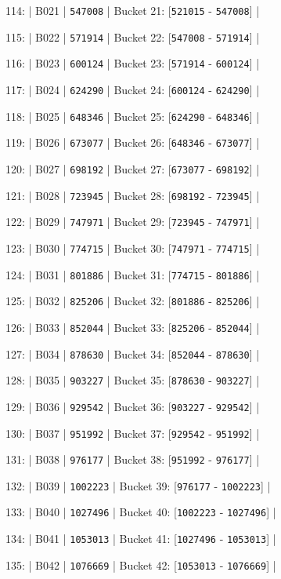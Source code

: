 \documentclass[11pt,a4paper]{article}
\begin{document}
{{{114: | B021 | \texttt{547008} | Bucket 21: [\texttt{521015} - \texttt{547008}] |

115: | B022 | \texttt{571914} | Bucket 22: [\texttt{547008} - \texttt{571914}] |

116: | B023 | \texttt{600124} | Bucket 23: [\texttt{571914} - \texttt{600124}] |

117: | B024 | \texttt{624290} | Bucket 24: [\texttt{600124} - \texttt{624290}] |

118: | B025 | \texttt{648346} | Bucket 25: [\texttt{624290} - \texttt{648346}] |

119: | B026 | \texttt{673077} | Bucket 26: [\texttt{648346} - \texttt{673077}] |

120: | B027 | \texttt{698192} | Bucket 27: [\texttt{673077} - \texttt{698192}] |

121: | B028 | \texttt{723945} | Bucket 28: [\texttt{698192} - \texttt{723945}] |

122: | B029 | \texttt{747971} | Bucket 29: [\texttt{723945} - \texttt{747971}] |

123: | B030 | \texttt{774715} | Bucket 30: [\texttt{747971} - \texttt{774715}] |

124: | B031 | \texttt{801886} | Bucket 31: [\texttt{774715} - \texttt{801886}] |

125: | B032 | \texttt{825206} | Bucket 32: [\texttt{801886} - \texttt{825206}] |

126: | B033 | \texttt{852044} | Bucket 33: [\texttt{825206} - \texttt{852044}] |

127: | B034 | \texttt{878630} | Bucket 34: [\texttt{852044} - \texttt{878630}] |

128: | B035 | \texttt{903227} | Bucket 35: [\texttt{878630} - \texttt{903227}] |

129: | B036 | \texttt{929542} | Bucket 36: [\texttt{903227} - \texttt{929542}] |

130: | B037 | \texttt{951992} | Bucket 37: [\texttt{929542} - \texttt{951992}] |

131: | B038 | \texttt{976177} | Bucket 38: [\texttt{951992} - \texttt{976177}] |

132: | B039 | \texttt{1002223} | Bucket 39: [\texttt{976177} - \texttt{1002223}] |

133: | B040 | \texttt{1027496} | Bucket 40: [\texttt{1002223} - \texttt{1027496}] |

134: | B041 | \texttt{1053013} | Bucket 41: [\texttt{1027496} - \texttt{1053013}] |

135: | B042 | \texttt{1076669} | Bucket 42: [\texttt{1053013} - \texttt{1076669}] |

}}}
\end{document}
